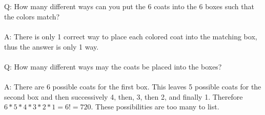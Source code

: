 \documentclass[11pt]{article}
\begin{document}
\begin{itemize}
\\\\
Q: How many different ways can you put the 6 coats into the 6 boxes such that the colors match?
\\\\
A: There is only 1 correct way to place each colored coat into the matching box, thus the answer is only 1 way.
\\\\
Q: How many different ways may the coats be placed into the boxes?
\\\\
A: There are 6 possible coats for the first box. This leaves 5 possible coats for the second box and then successively 4, then, 3, then 2, and finally 1. Therefore $6*5*4*3*2*1 = 6! =720$. These possibilities are too many to list.
 
\end{itemize}


%	




%


\cleardoublepage
\end{document}
